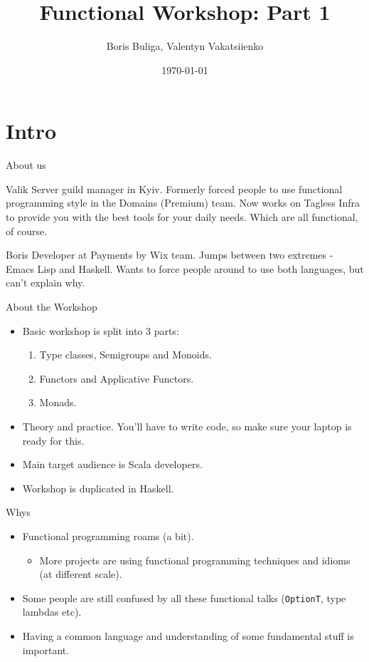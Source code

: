 \documentclass[presentation,aspectratio=169,smaller]{beamer}
\author{Boris Buliga, Valentyn Vakatsiienko}
\date{\today}
\title{Functional Workshop: Part 1}
\begin{document}
\maketitle

\section*{Intro}
\label{sec:orgf09023e}

\begin{frame}[label={sec:org337d2d9}]{About us}
\begin{block}{Valik}
Server guild manager in Kyiv. Formerly forced people to use functional
programming style in the Domains (Premium) team. Now works on Tagless Infra to
provide you with the best tools for your daily needs. Which are all functional,
of course.

\pause
\end{block}

\begin{block}{Boris}
Developer at Payments by Wix team. Jumps between two extremes - Emacs Lisp and
Haskell. Wants to force people around to use both languages, but can't explain
why.
\end{block}
\end{frame}

\begin{frame}[label={sec:org0a1242e}]{About the Workshop}
\begin{itemize}
\item Basic workshop is split into 3 parts:
\begin{enumerate}
\item Type classes, Semigroups and Monoids.
\item Functors and Applicative Functors.
\item Monads.
\end{enumerate}
\item Theory and practice. You'll have to write code, so make sure your laptop is
ready for this.
\item Main target audience is Scala developers.
\item Workshop is duplicated in Haskell.
\end{itemize}
\end{frame}

\begin{frame}[label={sec:orgd4579f1},fragile]{Whys}
 \begin{itemize}
\item Functional programming roams (a bit).
\begin{itemize}
\item More projects are using functional programming techniques and idioms (at
different scale).
\end{itemize}
\item Some people are still confused by all these functional talks (\texttt{OptionT}, type
lambdas etc).
\item Having a common language and understanding of some fundamental stuff is
important.
\end{itemize}
\end{frame}
\end{document}

